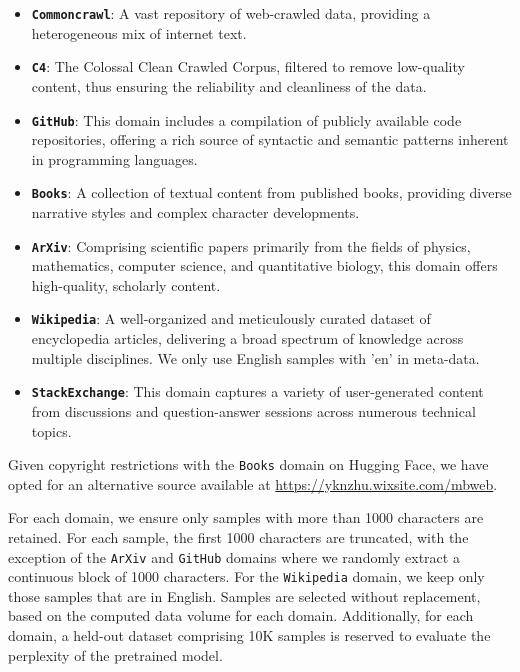 \documentclass{article} %
\newcommand{\call}[1]{\textbf{\textcolor{orange}{[Call: #1]}}}
\newcommand{\ys}[1]{\textbf{\textcolor{red}{[Yifan: #1]}}}
\begin{document}
\begin{appendices}{}
\begin{itemize}
\item \textbf{\texttt{Commoncrawl}}: A vast repository of web-crawled data, providing a heterogeneous mix of internet text.
\item \textbf{\texttt{C4}}: The Colossal Clean Crawled Corpus, filtered to remove low-quality content, thus ensuring the reliability and cleanliness of the data.
\item \textbf{\texttt{GitHub}}: This domain includes a compilation of publicly available code repositories, offering a rich source of syntactic and semantic patterns inherent in programming languages.
\item \textbf{\texttt{Books}}: A collection of textual content from published books, providing diverse narrative styles and complex character developments.
\item \textbf{\texttt{ArXiv}}: Comprising scientific papers primarily from the fields of physics, mathematics, computer science, and quantitative biology, this domain offers high-quality, scholarly content.
\item \textbf{\texttt{Wikipedia}}: A well-organized and meticulously curated dataset of encyclopedia articles, delivering a broad spectrum of knowledge across multiple disciplines. We only use English samples with 'en' in meta-data.
\item \textbf{\texttt{StackExchange}}: This domain captures a variety of user-generated content from discussions and question-answer sessions across numerous technical topics.
\end{itemize}
Given copyright restrictions with the \texttt{Books} domain on Hugging Face, we have opted for an alternative source available at \url{https://yknzhu.wixsite.com/mbweb}.

For each domain, we ensure only samples with more than 1000 characters are retained. For each sample, the first 1000 characters are truncated, with the exception of the \texttt{ArXiv} and \texttt{GitHub} domains where we randomly extract a continuous block of 1000 characters. For the \texttt{Wikipedia} domain, we keep only those samples that are in English. Samples are selected without replacement, based on the computed data volume for each domain. Additionally, for each domain, a held-out dataset comprising 10K samples is reserved to evaluate the perplexity of the pretrained model. 


\end{appendices}
\end{document}
